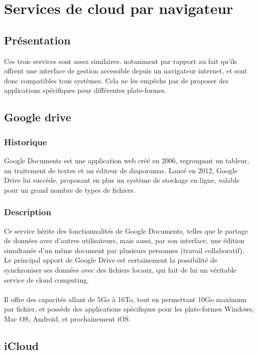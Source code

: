 \chapter{Services de cloud par navigateur}
\thispagestyle{EIP} %

\section{Présentation}
Ces trois services sont assez similaires. notamment par rapport au fait qu'ils offrent une interface de gestion accessible depuis un navigateur internet, et sont donc compatibles tous systèmes. Cela ne les empêche pas de proposer des applications spécifiques pour différentes plate-formes.

\section{Google drive}

\subsection{Historique}
Google Documents est une application web créé en 2006, regroupant un tableur, un traitement de textes et un éditeur de diaporamas.
Lancé en 2012, Google Drive lui succède, proposant en plus un système de stockage en ligne, valable pour un grand nombre de types de fichiers.\\

\subsection{Description}
Ce service hérite des fonctionnalités de Google Documents, telles que le partage de données avec d'autres utilisateurs, mais aussi, par son interface, une édition simultanée d'un même document par plusieurs personnes (travail collaboratif).\\
Le principal apport de Google Drive est certainement la possibilité de synchroniser ses données avec des fichiers locaux, qui fait de lui un véritable service de cloud computing.\\
\\
Il offre des capacités allant de 5Go à 16To, tout en permettant 10Go maximum par fichier, et possède des applications spécifiques pour les plate-formes Windows, Mac OS, Android, et prochainement iOS.\\


\section{iCloud}

